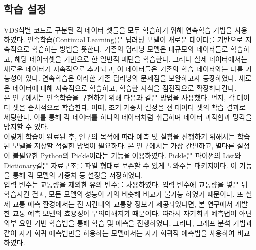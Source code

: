 \documentclass[11pt]{report}
\begin{document}
\subsection{학습 설정}
VDS식별 코드로 구분된 각 데이터 셋들을 모두 학습하기 위해 연속학습 기법을 사용하였다. 
연속학습(Continual Learning)은 딥러닝 모델이 새로운 데이터를 기반으로 지속적으로 학습하는 방법을 뜻한다. 
기존의 딥러닝 모델은 대규모의 데이터들로 학습하고, 해당 데이터셋을 기반으로 한 일반적 패턴을 학습한다. 
그러나 실제 데이터에서는 새로운 데이터가 지속적으로 추가되고, 이 데이터들은 기존의 학습 데이터와는 다를 가능성이 있다. 
연속학습은 이러한 기존 딥러닝의 문제점을 보완하고자 등장하였다. 
새로운 데이터에 대해 지속적으로 학습하고, 학습한 지식을 점진적으로 확장해나간다. \\
\indent 본 연구에서는 연속학습을 구현하기 위해 다음과 같은 방법을 사용했다. 
먼저, 각 데이터 셋을 순차적으로 학습한다. 
이때, 초기 가중치 설정을 전 데이터 셋의 학습 결과로 세팅한다. 
이를 통해 각 데이터를 하나의 데이터처럼 취급하며 데이터 과적합과 망각을 방지할 수 있다. \\
\indent 이렇게 학습이 완료된 후, 연구의 목적에 따라 예측 및 실험을 진행하기 위해서는 학습된 모델을 저장할 적절한 방법이 필요하다. 
본 연구에서는 가장 간편하고, 별다른 설정이 불필요한 Python의 Pickle이라는 기능을 이용하였다. 
Pickle은 파이썬의 List와 Dictionary같은 자료구조를 파일 형태로 보존할 수 있게 도와주는 패키지이다. 
이 기능을 통해 각 모델의 가중치 등 설정을 저장하였다. \\
\indent 입력 변수는 교통량을 제외한 유의 변수를 사용하였다. 
입력 변수에 교통량을 넣은 뒤 학습시킨 결과, 모든 모델의 성능이 거의 비슷해 비교가 불가능 하였기 때문이다. 
또 실제 교통 예측 환경에서는 전 시간대의 교통량 정보가 제공되었다면, 본 연구에서 개발한 교통 예측 모델의 효용성이 무의미해지기 때문이다. 
따라서 자기회귀 예측법이 아닌 외부 요인 기반 학습법을 통해 학습 및 예측을 진행하였다. 
그러나, 그래프 분석 기법과 같이 자기 회귀 예측법만을 허용하는 모델에서는 자기 회귀적 예측법을 사용하여 비교하였다. 
\end{document}
